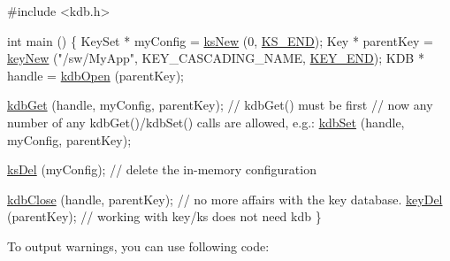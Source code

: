 \begin{DoxyCodeInclude}

\textcolor{preprocessor}{#include <kdb.h>}

\textcolor{keywordtype}{int} main ()
\{
        KeySet * myConfig = \hyperlink{group__keyset_ga671e1aaee3ae9dc13b4834a4ddbd2c3c}{ksNew} (0, \hyperlink{kdbenum_8c_a7a28fce3773b2c873c94ac80b8b4cd54}{KS\_END});
        Key * parentKey = \hyperlink{group__key_gad23c65b44bf48d773759e1f9a4d43b89}{keyNew} (\textcolor{stringliteral}{"/sw/MyApp"}, KEY\_CASCADING\_NAME, \hyperlink{group__key_gga91fb3178848bd682000958089abbaf40aa8adb6fcb92dec58fb19410eacfdd403}{KEY\_END});
        KDB * handle = \hyperlink{group__kdb_ga6808defe5870f328dd17910aacbdc6ca}{kdbOpen} (parentKey);

        \hyperlink{group__kdb_ga28e385fd9cb7ccfe0b2f1ed2f62453a1}{kdbGet} (handle, myConfig, parentKey); \textcolor{comment}{// kdbGet() must be first}
        \textcolor{comment}{// now any number of any kdbGet()/kdbSet() calls are allowed, e.g.:}
        \hyperlink{group__kdb_ga11436b058408f83d303ca5e996832bcf}{kdbSet} (handle, myConfig, parentKey);

        \hyperlink{group__keyset_ga27e5c16473b02a422238c8d970db7ac8}{ksDel} (myConfig); \textcolor{comment}{// delete the in-memory configuration}

        \hyperlink{group__kdb_gadb54dc9fda17ee07deb9444df745c96f}{kdbClose} (handle, parentKey); \textcolor{comment}{// no more affairs with the key database.}
        \hyperlink{group__key_ga3df95bbc2494e3e6703ece5639be5bb1}{keyDel} (parentKey);          \textcolor{comment}{// working with key/ks does not need kdb}
\}
\end{DoxyCodeInclude}


To output warnings, you can use following code\+:


